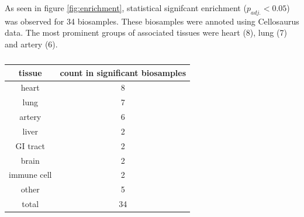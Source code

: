 As seen in figure \ref{fig:enrichment}, statistical signifcant enrichment ($p_{adj.}<0.05$) was observed for 34 biosamples. These biosamples were annoted using Cellosaurus data. The most prominent groups of associated tissues were heart (8), lung (7) and artery (6).


\begin{table}[h!]
\capstart
\centering
\begin{minipage}{\captionwidth}
    \caption[enriched tissues]{}
    \label{tab:enriched_tissues}
\end{minipage}
\begin{tabular}{|c|c|}
    \hline
    tissue      & count in significant biosamples \\ \hline
    heart       & 8                               \\
    lung        & 7                               \\
    artery      & 6                               \\
    liver       & 2                               \\
    GI tract    & 2                               \\
    brain       & 2                               \\
    immune cell & 2                               \\
    other       & 5                               \\ \hline
    total       & 34                              \\ \hline
    \end{tabular}
\end{table}
